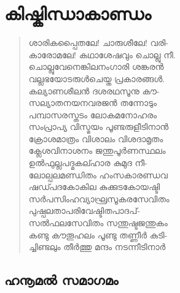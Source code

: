 

\chapter{കിഷ്കിന്ധാകാണ്ഡം}

\begin{verse}
ശാരികപ്പൈതലേ! ചാരുശീലേ! വരി-\\
കാരോമലേ! കഥാശേഷവും ചൊല്ലു നീ.\\
ചൊല്ലുവേനെങ്കിലനംഗാരി ശങ്കരന്‍\\
വല്ലഭയോടരുള്‍ചെയ്ത പ്രകാരങ്ങള്‍.\\
കല്യാണശീലന്‍ ദശരഥസൂനു കൗ-\\
സല്യാതനയനവരജന്‍ തന്നോടും\\
പമ്പാസരസ്തടം ലോകമനോഹരം\\
സംപ്രാപ്യ വിസ്മയം പൂണ്ടരുളീടിനാന്‍\\
ക്രോശമാത്രം വിശാലം വിശദാമൃതം\\
ക്ലേശവിനാശനം ജന്തുപൂര്‍ണസ്ഥലം\\
ഉല്‍ഫുല്ലപദ്മകല്ഹാര കുമുദ നീ-\\
ലോല്പലമണ്ഡിതം ഹംസകാരണ്ഡവ\\
ഷഡ്പദകോകില കുക്കുടകോയഷ്ടി\\
സര്‍പസിംഹവ്യാഘ്രസൂകരസേവിതം\\
പുഷ്പലതാപരിവേഷ്ടിതപാദപ്-\\
സല്‍ഫലസേവിതം സന്തുഷ്ടജന്തുകം\\
കണ്ടു കൗതൂഹലം പൂണ്ടു തണ്ണീര്‍ കുടി-\\
ച്ചിണ്ടലും തീര്‍ത്തു മന്ദം നടന്നീടിനാര്‍
\end{verse}


\section{ഹനൂമല്‍ സമാഗമം}

